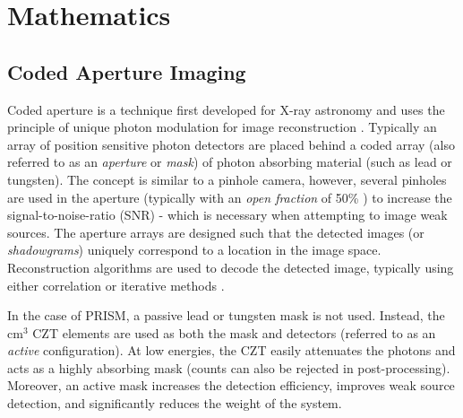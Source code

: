 \documentclass[10pt]{article}
\begin{document}
\section{Mathematics}


\subsection{Coded Aperture Imaging}

Coded aperture is a technique first developed for X-ray astronomy and uses the principle of unique photon modulation for image reconstruction \cite{Dicke1968}. Typically an array of position sensitive photon detectors are placed behind a coded array (also referred to as an \emph{aperture} or \emph{mask}) of photon absorbing material (such as lead or tungsten). The concept is similar to a pinhole camera, however, several pinholes are used in the aperture (typically with an \emph{open fraction} of 50\% \cite{FenimoreCannon1978}) to increase the signal-to-noise-ratio (SNR) - which is necessary when attempting to image weak sources. The aperture arrays are designed such that the detected images (or \emph{shadowgrams}) uniquely correspond to a location in the image space. Reconstruction algorithms are used to decode the detected image, typically using either correlation or iterative methods \cite{FenimoreCannon1978, LangeCarson1984}.


In the case of PRISM, a passive lead or tungsten mask is not used. Instead, the cm$^3$ CZT elements are used as both the mask and detectors (referred to as an \emph{active} configuration). At low energies, the CZT easily attenuates the photons and acts as a highly absorbing mask (counts can also be rejected in post-processing). Moreover, an active mask increases the detection efficiency, improves weak source detection, and significantly reduces the weight of the system.
\end{document}
